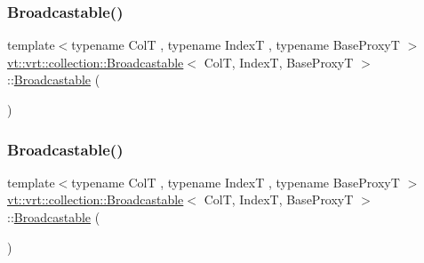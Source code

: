 \mbox{\label{structvt_1_1vrt_1_1collection_1_1_broadcastable_ae8d8b03ad2ab2d9c74a3c2b4537ff806}} 
\subsubsection{\texorpdfstring{Broadcastable()}{Broadcastable()}\hspace{0.1cm}{\footnotesize\ttfamily [2/4]}}
{\footnotesize\ttfamily template$<$typename ColT , typename IndexT , typename Base\+ProxyT $>$ \\
\hyperlink{structvt_1_1vrt_1_1collection_1_1_broadcastable}{vt\+::vrt\+::collection\+::\+Broadcastable}$<$ ColT, IndexT, Base\+ProxyT $>$\+::\hyperlink{structvt_1_1vrt_1_1collection_1_1_broadcastable}{Broadcastable} (\begin{DoxyParamCaption}\item[{\hyperlink{structvt_1_1vrt_1_1collection_1_1_broadcastable}{Broadcastable}$<$ ColT, IndexT, Base\+ProxyT $>$ const \&}]{ }\end{DoxyParamCaption})\hspace{0.3cm}{\ttfamily [default]}}

\mbox{\label{structvt_1_1vrt_1_1collection_1_1_broadcastable_ae2095333f93c2448ee62b0dd7edcebd0}} 
\subsubsection{\texorpdfstring{Broadcastable()}{Broadcastable()}\hspace{0.1cm}{\footnotesize\ttfamily [3/4]}}
{\footnotesize\ttfamily template$<$typename ColT , typename IndexT , typename Base\+ProxyT $>$ \\
\hyperlink{structvt_1_1vrt_1_1collection_1_1_broadcastable}{vt\+::vrt\+::collection\+::\+Broadcastable}$<$ ColT, IndexT, Base\+ProxyT $>$\+::\hyperlink{structvt_1_1vrt_1_1collection_1_1_broadcastable}{Broadcastable} (\begin{DoxyParamCaption}\item[{\hyperlink{structvt_1_1vrt_1_1collection_1_1_broadcastable}{Broadcastable}$<$ ColT, IndexT, Base\+ProxyT $>$ \&\&}]{ }\end{DoxyParamCaption})\hspace{0.3cm}{\ttfamily [default]}}

